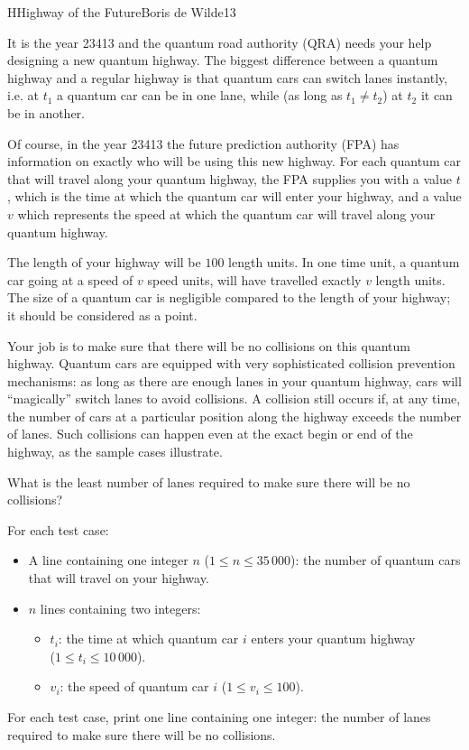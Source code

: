 \begin{icpcproblem}{H}{Highway of the Future}{Boris de Wilde}{13}

It is the year 23413 and the quantum road authority (QRA) needs your
help designing a new quantum highway.
The biggest difference between a quantum highway and a
regular highway is that quantum cars can switch lanes instantly,
i.e. at $t_1$ a quantum car can be in one lane, while (as long as
$t_1 \neq t_2$) at $t_2$ it can be in another.

Of course, in the year 23413 the future prediction authority (FPA)
has information on exactly who will be using this new highway.
For each quantum car that will travel along your quantum highway,
the FPA supplies you with a value $t$, which is the time at which
the quantum car will enter your highway, and a value $v$ which
represents the speed at which the quantum car will travel along
your quantum highway.

The length of your highway will be $100$ length units.
In one time unit, a quantum car going at a speed of $v$ speed units,
will have travelled exactly $v$ length units.
The size of a quantum car is negligible compared to the length of
your highway; it should be considered as a point.

Your job is to make sure that there will be no collisions on this
quantum highway. Quantum cars are equipped with very sophisticated
collision prevention mechanisms: as long as there are enough lanes
in your quantum highway, cars will ``magically'' switch lanes
to avoid collisions.
A collision still occurs if, at any time, the number of cars at a particular position along the highway exceeds the number of lanes.
Such collisions can happen even at the exact begin or end of the highway, as the sample cases illustrate.

What is the least number of lanes required to make sure there will
be no collisions?


For each test case:
\begin{itemize}
\item A line containing one integer $n$ ($1 \le n \le 35\,000$): the number of quantum cars that will travel on your highway.
\item $n$ lines containing two integers:
\begin{itemize}
\item $t_i$: the time at which quantum car $i$ enters your quantum highway \\ ($1 \le t_i \le 10\,000$).
\item $v_i$: the speed of quantum car $i$ ($1 \le v_i \le 100$).
\end{itemize}
\end{itemize}


For each test case, print one line containing one integer:
the number of lanes required to make sure there will be no collisions.

\clearpage
{}

\end{icpcproblem}
